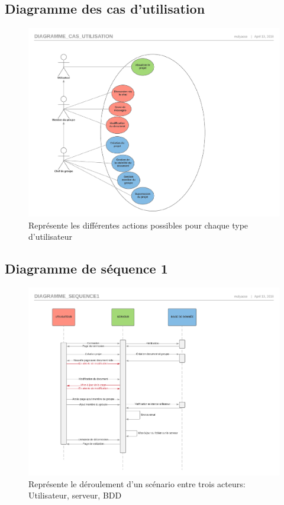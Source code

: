 \documentclass[11pt,a4paper]{article}
\begin{document}
\subsection{Diagramme des cas d'utilisation}
\begin{figure}[!h]
\includegraphics[scale=0.7]{Image/Diagramme_cas_utilisation.pdf}
\caption{Représente les différentes actions possibles pour chaque type d'utilisateur}
\end{figure}
\newpage
\subsection{Diagramme de séquence 1}
\begin{figure}[!h]
\includegraphics[scale=0.7]{Image/Diagramme_sequence1.pdf}
\caption{Représente le déroulement d'un scénario entre trois acteurs: Utilisateur, serveur, BDD}
\end{figure}
\newpage
\end{document}
